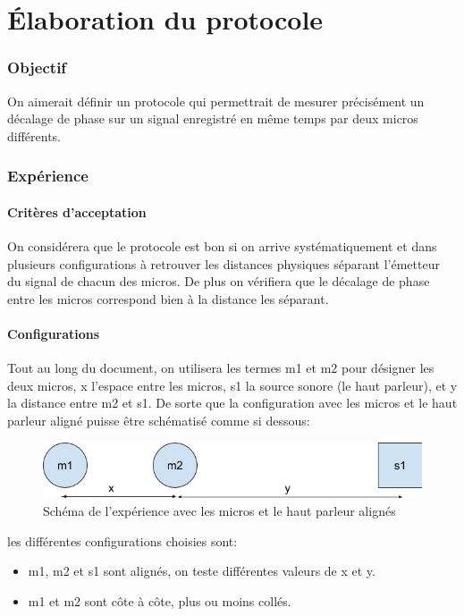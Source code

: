 \documentclass[12pt,a4paper]{article}
\author{Baptiste Lesquoy}
\begin{document}
\part{Élaboration du protocole}
\section{Objectif}
On aimerait définir un protocole qui permettrait de mesurer précisément un décalage de phase sur un signal enregistré en même temps par deux micros différents.


\section{Expérience}
\subsection{Critères d'acceptation}
On considérera que le protocole est bon si on arrive systématiquement et dans plusieurs configurations à retrouver les distances physiques séparant l'émetteur du signal de chacun des micros. De plus on vérifiera que le décalage de phase entre les micros correspond bien à la distance les séparant.

\subsection{Configurations}
Tout au long du document, on utilisera les termes m1 et m2 pour désigner les deux micros, x l'espace entre les micros, s1 la source sonore (le haut parleur), et y la distance entre m2 et s1. De sorte que la configuration avec les micros et le haut parleur aligné puisse être schématisé comme si dessous:
\begin{figure}[H]
\includegraphics[width=\textwidth]{../24-02-16/mesures/m1/schema.png} 
\caption{Schéma de l'expérience avec les micros et le haut parleur alignés}
\end{figure}
les différentes configurations choisies sont:
\begin{itemize}
\item m1, m2 et s1 sont alignés, on teste différentes valeurs de x et y.
\item m1 et m2 sont côte à côte, plus ou moins collés.
\end{itemize}
\end{document}
